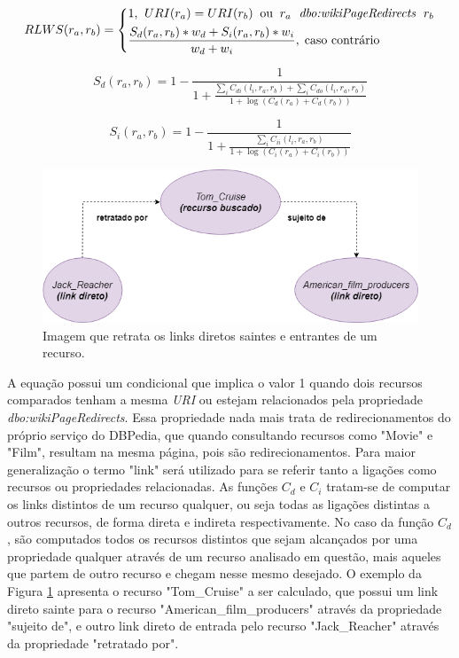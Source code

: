 \begin{equation}
	RLWS(r_a, r_b) =
	\begin{dcases*}
		1 \text{,} \;\; URI(r_a) = URI(r_b) \;\; \text{ou} \;\; r_a \; \textit{ dbo:wikiPageRedirects } \; r_b\\
		\frac{S_d(r_a, r_b) * w_d + S_i(r_a, r_b) * w_i}{w_d + w_i}, \; \text{caso contrário}
	\end{dcases*}
\label{eq:rlws}
\end{equation}

\begin{equation}
	S_d(r_a, r_b) = 1 - \frac{1}{1 + \frac{\sum_i C_{di}(l_i, r_a, r_b) + \sum_i C_{do}(l_i, r_a, r_b)}{1 + \log (C_d(r_a) + C_d(r_b))}}
\label{eq:rlws_ex1}
\end{equation}

\begin{equation}
	S_i(r_a, r_b) = 1 - \frac{1}{1 + \frac{\sum_i C_{ii}(l_i, r_a, r_b)}{1 + \log (C_i(r_a) + C_i(r_b))}}
\label{eq:rlws_ex2}
\end{equation}

\begin{figure}
	\centering
	\includegraphics[scale=0.4]{imagens/cd_links.png}
	\caption{Imagem que retrata os links diretos saintes e entrantes de um recurso.}
	\label{fig:cd_links}
\end{figure}

A equação possui um condicional que implica o valor 1 quando dois recursos comparados tenham a mesma \textit{URI} ou estejam relacionados pela propriedade \textit{dbo:wikiPageRedirects}. Essa propriedade nada mais trata de redirecionamentos do próprio serviço do DBPedia, que quando consultando recursos como "Movie" e "Film", resultam na mesma página, pois são redirecionamentos. Para maior generalização o termo "link" será utilizado para se referir tanto a ligações como recursos ou propriedades relacionadas. As funções $C_d$ e $C_i$ tratam-se de computar os links distintos de um recurso qualquer, ou seja todas as ligações distintas a outros recursos, de forma direta e indireta respectivamente. No caso da função $C_d$, são computados todos os recursos distintos que sejam alcançados por uma propriedade qualquer através de um recurso analisado em questão, mais aqueles que partem de outro recurso e chegam nesse mesmo desejado. O exemplo da Figura \ref{fig:cd_links} apresenta o recurso "Tom\_Cruise" a ser calculado, que possui um link direto sainte para o recurso "American\_film\_producers" através da propriedade "sujeito de", e outro link direto de entrada pelo recurso "Jack\_Reacher" através da propriedade "retratado por".

